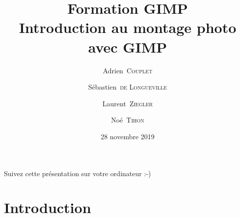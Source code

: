 \documentclass[10pt,svgnames,usenames,table]{beamer}
\institute{Louvain-li-Nux}
\title{\textbf{Formation GIMP}\\
Introduction au montage photo avec GIMP}
\author{Adrien~\textsc{Couplet} \and Sébastien~\textsc{de Longueville} \and Laurent~\textsc{Ziegler} \and Noé~\textsc{Tihon} }
\date{28 novembre 2019}
\begin{document}
\begin{frame}
	\maketitle
\end{frame}

\begin{frame}
  \begin{center}\Large
  Suivez cette présentation sur votre ordinateur :-)
  
  \vspace{1cm}
  \end{center}
\end{frame}

\section{Introduction}
\end{document}
